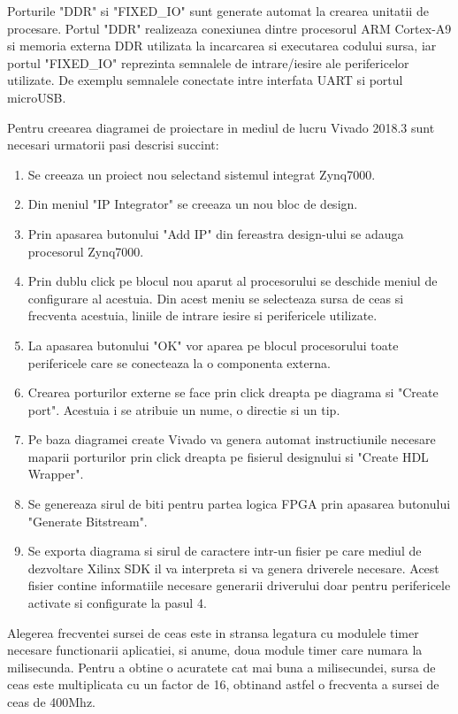 Porturile "DDR" si "FIXED\_IO" sunt generate automat la crearea unitatii de procesare. Portul "DDR" realizeaza conexiunea dintre procesorul ARM Cortex-A9 si memoria 
externa DDR utilizata la incarcarea si executarea codului sursa, iar portul "FIXED\_IO" reprezinta semnalele de intrare/iesire ale perifericelor utilizate. De exemplu 
semnalele conectate intre interfata UART si portul microUSB.

Pentru creearea diagramei de proiectare in mediul de lucru Vivado 2018.3 sunt necesari urmatorii pasi descrisi succint:
\begin{enumerate}
	\item Se creeaza un proiect nou selectand sistemul integrat Zynq7000.
	\item Din meniul "IP Integrator" se creeaza un nou bloc de design.
	\item Prin apasarea butonului "Add IP" din fereastra design-ului se adauga procesorul Zynq7000.
	\item Prin dublu click pe blocul nou aparut al procesorului se deschide meniul de configurare al acestuia. Din acest meniu se selecteaza sursa de ceas si frecventa 
	acestuia, liniile de intrare iesire si perifericele utilizate.
    \item La apasarea butonului "OK" vor aparea pe blocul procesorului toate perifericele care se conecteaza la o componenta externa.
    \item Crearea porturilor externe se face prin click dreapta pe diagrama si "Create port". Acestuia i se atribuie un nume, o directie si un tip.
    \item Pe baza diagramei create Vivado va genera automat instructiunile necesare maparii porturilor prin click dreapta pe fisierul designului si "Create HDL Wrapper".
    \item Se genereaza sirul de biti pentru partea logica FPGA prin apasarea butonului "Generate Bitstream".
    \item Se exporta diagrama si sirul de caractere intr-un fisier pe care mediul de dezvoltare Xilinx SDK il va interpreta si va genera driverele necesare. Acest 
    fisier contine informatiile necesare generarii driverului doar pentru perifericele activate si configurate la pasul 4.
\end{enumerate}

Alegerea frecventei sursei de ceas este in stransa legatura cu modulele timer necesare functionarii aplicatiei, si anume, doua module timer care numara la milisecunda. 
Pentru a obtine o acuratete cat mai buna a milisecundei, sursa de ceas este multiplicata cu un factor de 16, obtinand astfel o frecventa a sursei de ceas de 400Mhz.


